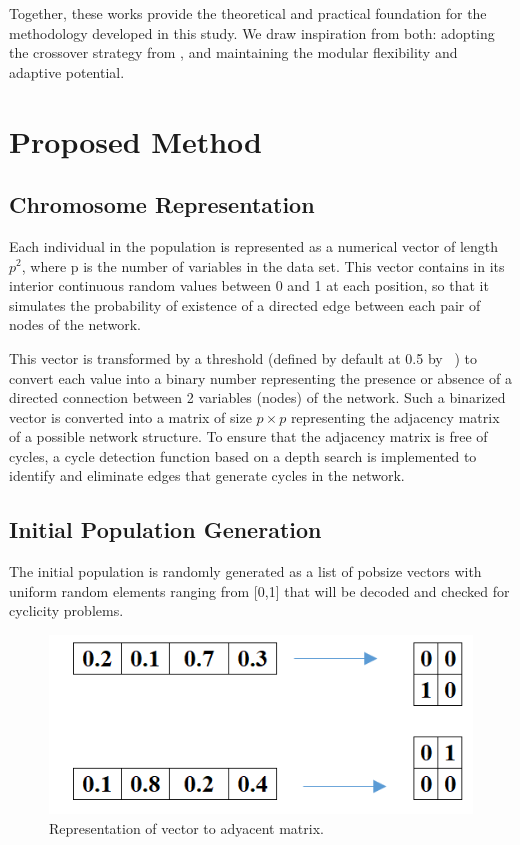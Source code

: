 \documentclass[runningheads]{llncs}
\begin{document}
Together, these works provide the theoretical and practical foundation for the methodology developed in this study. We draw inspiration from both: adopting the crossover strategy from \cite{sun2022bayesian}, and maintaining the modular flexibility and adaptive potential.


\newpage

\section{Proposed Method}

\subsection{Chromosome Representation}

Each individual in the population is represented as a numerical vector of length $p^2$, where p is the number of variables in the data set. This vector contains in its interior continuous random values between 0 and 1 at each position, so that it simulates the probability of existence of a directed edge between each pair of nodes of the network.

This vector is transformed by a threshold (defined by default at 0.5 by ~\cite{sun2022bayesian}) to convert each value into a binary number representing the presence or absence of a directed connection between 2 variables (nodes) of the network. Such a binarized vector is converted into a matrix of size $p\times p$ representing the adjacency matrix of a possible network structure.
To ensure that the adjacency matrix is free of cycles, a cycle detection function based on a depth search is implemented to identify and eliminate edges that generate cycles in the network.

\subsection{Initial Population Generation}

The initial population is randomly generated as a list of pobsize vectors with uniform random elements ranging from [0,1] that will be decoded and checked for cyclicity problems.


\begin{figure}[h!]
	\centering
	\includegraphics[width=0.7\linewidth]{IMG/P1}
	\caption{Representation of vector to adyacent matrix.}
	\label{fig:p1}
\end{figure}
\end{document}
